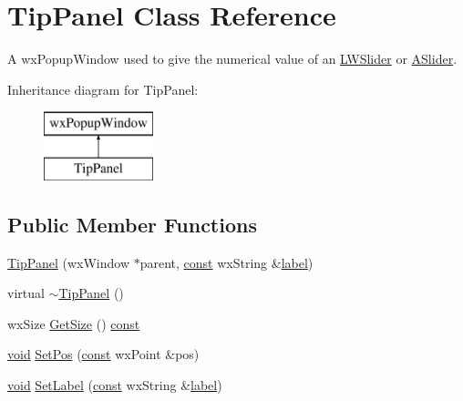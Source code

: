 \hypertarget{class_tip_panel}{}\section{Tip\+Panel Class Reference}
\label{class_tip_panel}


A wx\+Popup\+Window used to give the numerical value of an \hyperlink{class_l_w_slider}{L\+W\+Slider} or \hyperlink{class_a_slider}{A\+Slider}.  


Inheritance diagram for Tip\+Panel\+:\begin{figure}[H]
\begin{center}
\leavevmode
\includegraphics[height=2.000000cm]{class_tip_panel}
\end{center}
\end{figure}
\subsection*{Public Member Functions}
\begin{DoxyCompactItemize}
\item 
\hyperlink{class_tip_panel_a748de1dbc796ff85c657487c76066c7e}{Tip\+Panel} (wx\+Window $\ast$parent, \hyperlink{getopt1_8c_a2c212835823e3c54a8ab6d95c652660e}{const} wx\+String \&\hyperlink{_tags_8cpp_a0a3345b0d4574d7adffe113dacd8ccec}{label})
\item 
virtual \hyperlink{class_tip_panel_ab6ba197235277efb9965c74c66639a47}{$\sim$\+Tip\+Panel} ()
\item 
wx\+Size \hyperlink{class_tip_panel_ab94a507bb1324844b40f3ede741cc124}{Get\+Size} () \hyperlink{getopt1_8c_a2c212835823e3c54a8ab6d95c652660e}{const} 
\item 
\hyperlink{sound_8c_ae35f5844602719cf66324f4de2a658b3}{void} \hyperlink{class_tip_panel_afaf0b72afe13a9be3089b46cd6edee64}{Set\+Pos} (\hyperlink{getopt1_8c_a2c212835823e3c54a8ab6d95c652660e}{const} wx\+Point \&pos)
\item 
\hyperlink{sound_8c_ae35f5844602719cf66324f4de2a658b3}{void} \hyperlink{class_tip_panel_ac0f60dddf508230e173854403edcbcd7}{Set\+Label} (\hyperlink{getopt1_8c_a2c212835823e3c54a8ab6d95c652660e}{const} wx\+String \&\hyperlink{_tags_8cpp_a0a3345b0d4574d7adffe113dacd8ccec}{label})
\end{DoxyCompactItemize}


